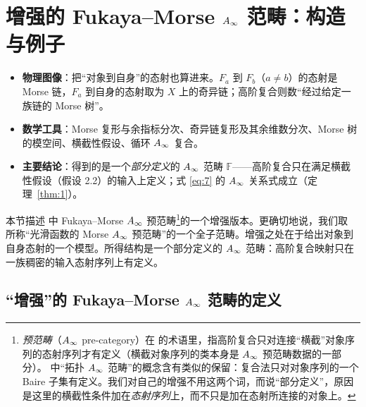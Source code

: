 \section{增强的 Fukaya--Morse $A_\infty$ 范畴：构造与例子}\label{sec:2}

\begin{takeaway}
\begin{itemize}
  \item \textbf{物理图像}：把“对象到自身”的态射也算进来。$F_a$ 到 $F_b$（$a\neq b$）的态射是 Morse 链，$F_a$ 到自身的态射取为 $X$ 上的奇异链；高阶复合则数“经过给定一族链的 Morse 树”。
  \item \textbf{数学工具}：Morse 复形与余指标分次、奇异链复形及其余维数分次、Morse 树的模空间、横截性假设、循环 $A_\infty$ 复合。
  \item \textbf{主要结论}：得到的是一个\emph{部分定义}的 $A_\infty$ 范畴 $\mathbb{F}$——高阶复合只在满足横截性假设（假设 2.2）的输入上定义；式 \eqref{eq:7} 的 $A_\infty$ 关系式成立（定理~\ref{thm:1}）。
\end{itemize}
\end{takeaway}

本节描述 \cite{fukaya,fukayaoh,kontsevichsoibelman} 中 Fukaya--Morse $A_\infty$ 预范畴\footnote{\emph{预范畴}（$A_\infty$ pre-category）在 \cite[第 4.3 节]{kontsevichsoibelman} 的术语里，指高阶复合只对连接“横截”对象序列的态射序列才有定义（横截对象序列的类本身是 $A_\infty$ 预范畴数据的一部分）。\cite{fukayaoh} 中“拓扑 $A_\infty$ 范畴”的概念含有类似的保留：复合法只对对象序列的一个 Baire 子集有定义。我们对自己的增强不用这两个词，而说“部分定义”，原因是这里的横截性条件加在\emph{态射序列}上，而不只是加在态射所连接的对象上。}的一个增强版本。更确切地说，我们取 \cite[第 6.2 节]{kontsevichsoibelman} 所称“光滑函数的 Morse $A_\infty$ 预范畴”的一个全子范畴。增强之处在于给出对象到自身态射的一个模型。所得结构是一个部分定义的 $A_\infty$ 范畴：高阶复合映射只在一族稠密的输入态射序列上有定义。

\subsection{“增强”的 Fukaya--Morse $A_\infty$ 范畴的定义}\label{sec:2.1}


